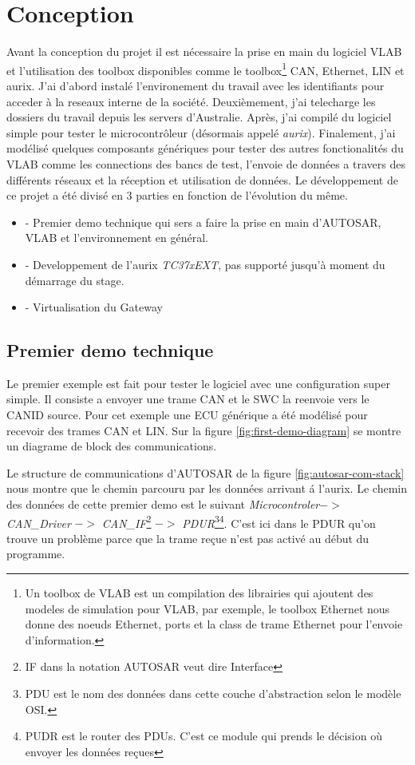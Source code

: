 \section{Conception}

Avant la conception du projet il est nécessaire la prise en main du logiciel VLAB et l'utilisation des toolbox disponibles comme le toolbox\footnote{Un toolbox de VLAB est un compilation des librairies qui ajoutent des modeles de simulation pour VLAB, par exemple, le toolbox Ethernet nous donne des noeuds Ethernet, ports et la class de trame Ethernet pour l'envoie d'information.} CAN, Ethernet, LIN et aurix. J'ai d'abord instal\'e l'environement du travail avec les identifiants pour acceder \`a la reseaux interne de la soci\'et\'e. Deuxièmement, j'ai telecharge les dossiers du travail depuis les servers d'Australie. Apr\`es, j'ai compil\'e du logiciel simple pour tester le microcontr\^oleur (désormais appel\'e \textit{aurix}). Finalement, j'ai mod\'elis\'e quelques composants génériques pour tester des autres fonctionalit\'es du VLAB comme les connections des bancs de test, l'envoie de donn\'ees a travers des différents réseaux et la réception et utilisation de donn\'ees. Le développement de ce projet a \'et\'e divis\'e en 3 parties en fonction de l'évolution du même.

\begin{itemize}
    \item - Premier demo technique qui sers a faire la prise en main d'AUTOSAR, VLAB et l'environnement en général.
    \item - Developpement de l'aurix \textit{TC37xEXT}, pas support\'e jusqu'\`a moment du démarrage du stage.
    \item - Virtualisation du Gateway
\end{itemize}

\subsection{Premier demo technique}

Le premier exemple est fait pour tester le logiciel avec une configuration super simple. Il consiste a envoyer une trame CAN et le SWC la reenvoie vers le CANID source. Pour cet exemple une ECU générique a \'et\'e modélisé pour recevoir des trames CAN et LIN. Sur la figure \ref{fig:first-demo-diagram} se montre un diagrame de block des communications. 

Le structure de communications d'AUTOSAR de la figure \ref{fig:autosar-com-stack} nous montre que le chemin parcouru par les donn\'ees arrivant \'a l'aurix. Le chemin des donn\'ees de cette premier demo est le suivant \textit{Microcontroler}$ ->$ \textit{CAN\_Driver} $->$ \textit{CAN\_IF}\footnote{IF dans la notation AUTOSAR veut dire Interface} $->$ \textit{PDUR}\footnote{PDU est le nom des donn\'ees dans cette couche d'abstraction selon le mod\`ele OSI.}\footnote{PUDR est le router des PDUs. C'est ce module qui prends le décision o\`u envoyer les donn\'ees re\c cues}. C'est ici dans le PDUR qu'on trouve un probl\`eme parce que la trame re\c cue n'est pas activ\'e au début du programme.

